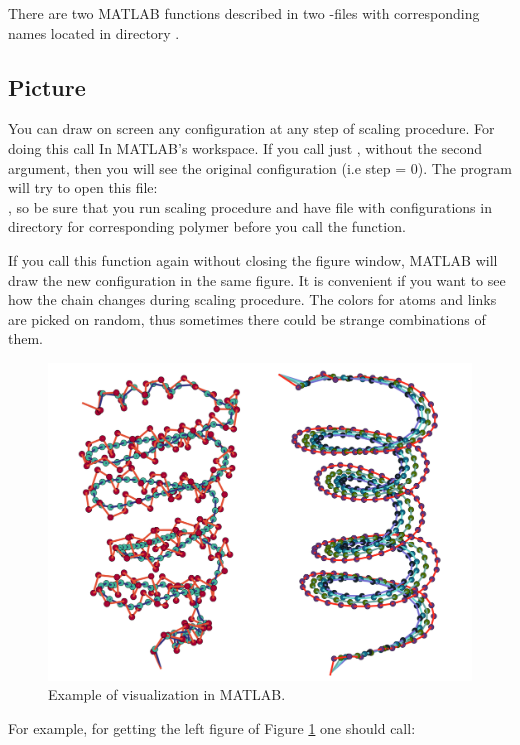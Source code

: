 \documentclass[12pt]{article}
\begin{document}
\begin{mySection}\label{sec:matlab}
There are two MATLAB functions described in two -files  with corresponding names located in directory  .
\subsection{Picture}
You can draw on screen any configuration at any step of scaling procedure. For doing this call  
In MATLAB's workspace. If you call just , without the second argument, then you will see the original configuration (i.e step = 0). 
The program will try to open this file:\\
,
so be sure that you run scaling procedure and have file with configurations in  directory for corresponding polymer before you call the function.

If you call this function again without closing the figure window, MATLAB will draw the new configuration in the same figure. It is convenient if you want to see how the chain changes during scaling procedure. The colors for atoms and links are picked on random, thus sometimes there could be strange combinations of them.
\begin{figure}[H]
	\centering
	\vskip -0cm 
  	\includegraphics[width=0.7\linewidth]{scaling.pdf}
  	\caption{Example of visualization in MATLAB.}
	\label{fig:scaling}
\end{figure}
For example, for getting the left figure of Figure \ref{fig:scaling} one should call:\\
 \\


\end{mySection}
\end{document}
